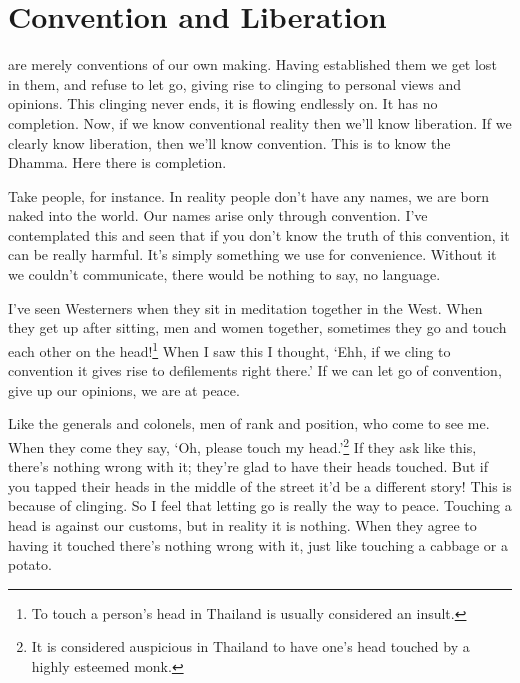 

\chapter{Convention and Liberation}

 are merely conventions of our own making. Having established them we get lost in them, and refuse to let go, giving rise to clinging to personal views and opinions. This clinging never ends, it is  flowing endlessly on. It has no completion. Now, if we know conventional reality then we'll know liberation. If we clearly know liberation, then we'll know convention. This is to know the Dhamma. Here there is completion.

Take people, for instance. In reality people don't have any names, we are born naked into the world. Our names arise only through convention. I've contemplated this and seen that if you don't know the truth of this convention, it can be really harmful. It's simply something we use for convenience. Without it we couldn't communicate, there would be nothing to say, no language.

I've seen Westerners when they sit in meditation together in the West. When they get up after sitting, men and women together, sometimes they go and touch each other on the head!\footnote{To touch a person's head in Thailand is usually considered an insult. } When I saw this I thought, `Ehh, if we cling to convention it gives rise to defilements right there.' If we can let go of convention, give up our opinions, we are at peace.

Like the generals and colonels, men of rank and position, who come to see me. When they come they say, `Oh, please touch my head.'\footnote{It is considered auspicious in Thailand to have one's head touched by a highly esteemed monk.} If they ask like this, there's nothing wrong with it; they're glad to have their heads touched. But if you tapped their heads in the middle of the street it'd be a different story! This is because of clinging. So I feel that letting go is really the way to peace. Touching a head is against our customs, but in reality it is nothing. When they agree to having it touched there's nothing wrong with it, just like touching a cabbage or a potato.

